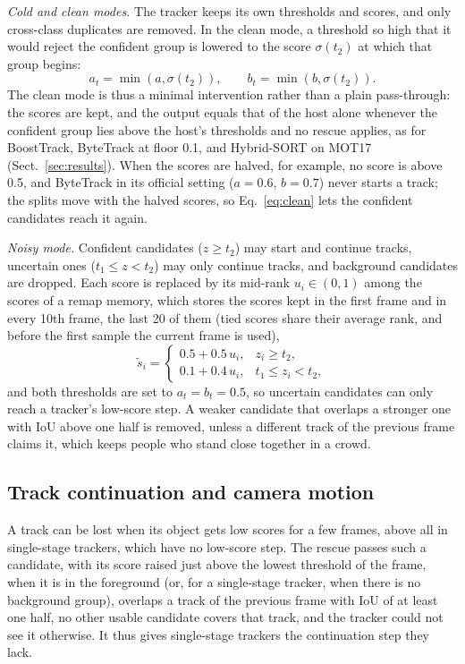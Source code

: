 \documentclass[pdflatex,sn-mathphys-num,iicol]{sn-jnl}
\begin{document}
\emph{Cold and clean modes.} The tracker keeps its own thresholds and scores, and only cross-class
duplicates are removed. In the clean mode, a threshold so high that it would reject the confident
group is lowered to the score $\sigma(t_2)$ at which that group begins:
\begin{equation}
a_t=\min\!\left(a,\sigma(t_2)\right),\qquad b_t=\min\!\left(b,\sigma(t_2)\right).
\label{eq:clean}
\end{equation}
The clean mode is thus a minimal intervention rather than a plain pass-through: the scores are
kept, and the output equals that of the host alone whenever the confident group lies above the
host's thresholds and no rescue applies, as for BoostTrack, ByteTrack at floor 0.1, and Hybrid-SORT
on MOT17 (Sect.~\ref{sec:results}). When the scores are halved, for example, no score is above 0.5, and ByteTrack in
its official setting ($a=0.6$, $b=0.7$) never starts a track; the splits move with the halved
scores, so Eq.~\eqref{eq:clean} lets the confident candidates reach it again.

\emph{Noisy mode.} Confident candidates ($z\ge t_2$) may start and continue tracks, uncertain ones
($t_1\le z<t_2$) may only continue tracks, and background candidates are dropped. Each score is
replaced by its mid-rank $u_i\in(0,1)$ among the scores of a remap memory, which stores the scores
kept in the first frame and in every 10th frame, the last 20 of them (tied scores share their average
rank, and before the first sample the current frame is used),
\begin{equation}
\tilde{s}_i=
\begin{cases}
0.5+0.5\,u_i, & z_i\ge t_2,\\
0.1+0.4\,u_i, & t_1\le z_i<t_2,
\end{cases}
\label{eq:remap}
\end{equation}
and both thresholds are set to $a_t=b_t=0.5$, so uncertain candidates can only reach a tracker's
low-score step. A weaker candidate that overlaps a stronger one with IoU above one half is removed,
unless a different track of the previous frame claims it, which keeps people who stand close
together in a crowd.

\subsection{Track continuation and camera motion}\label{sec:rescue}
A track can be lost when its object gets low scores for a few frames, above all in single-stage
trackers, which have no low-score step. The rescue passes such a candidate, with its score raised
just above the lowest threshold of the frame, when it is in the foreground (or, for a
single-stage tracker, when there is no background group), overlaps a track of the previous frame
with IoU of at least one half, no other usable candidate covers that track, and the tracker could
not see it otherwise. It thus gives single-stage trackers the continuation step they lack.
\end{document}
